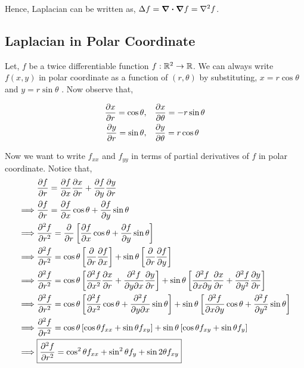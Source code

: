 \documentclass[../Analysis-3.tex]{subfiles}
\begin{document}
Hence, Laplacian can be written as, $\Delta f = \div\grad f = \laplacian f$.

\subsection*{Laplacian in Polar Coordinate}

Let, $f$ be a twice differentiable function $f: \mathbb{R}^2 \to \mathbb{R}$. We can always write $f(x,y)$ in polar coordinate as a function of $(r,\theta)$ by substituting, $x = r\cos{\theta}$ and $y= r\sin{\theta}$ . Now observe that,

\begin{align*}
    \pdv{x}{r} = \cos{\theta}, \quad & \pdv{x}{\theta} = -r\sin{\theta} \\
    \pdv{y}{r} = \sin{\theta}, \quad & \pdv{y}{\theta} = r\cos{\theta}
\end{align*}

Now we want to write $f_{xx}$ and $f_{yy}$ in terms of partial derivatives of $f$ in polar coordinate. Notice that,
\begin{align*}
             & \pdv{f}{r} = \pdv{f}{x} \pdv{x}{r} + \pdv{f}{y}\pdv{y}{r}                                                                                                                               \\
    \implies & \pdv{f}{r} = \pdv{f}{x} \cos{\theta} + \pdv{f}{y}\sin{\theta}                                                                                                                           \\
    \implies & \pdv[2]{f}{r} = \pdv{}{r} \left[\pdv{f}{x} \cos{\theta} + \pdv{f}{y} \sin{\theta} \right]                                                                                               \\
    \implies & \pdv[2]{f}{r} = \cos{\theta} \left[\pdv{}{r} \pdv{f}{x}\right] + \sin{\theta} \left[\pdv{}{r} \pdv{f}{y} \right]                                                                        \\
    \implies & \pdv[2]{f}{r} = \cos{\theta} \left[\pdv[2]{f}{x} \pdv{x}{r} + \pdv{f}{y}{x} \pdv{y}{r} \right] + \sin{\theta} \left[\pdv{f}{x}{y} \pdv{x}{r} + \pdv[2]{f}{y} \pdv{y}{r} \right]         \\
    \implies & \pdv[2]{f}{r} = \cos{\theta} \left[\pdv[2]{f}{x} \cos{\theta} + \pdv{f}{y}{x} \sin{\theta} \right] + \sin{\theta} \left[\pdv{f}{x}{y} \cos{\theta} + \pdv[2]{f}{y} \sin{\theta} \right] \\
    \implies & \pdv[2]{f}{r} = \cos{\theta} \left[\cos{\theta} f_{xx} + \sin{\theta} f_{xy} \right] + \sin{\theta} \left[\cos{\theta} f_{xy} + \sin{\theta} f_{y} \right]                              \\
    \implies & \boxed{\pdv[2]{f}{r} = \cos^2 \theta f_{xx} + \sin^2 \theta f_{y} + \sin 2 \theta f_{xy}}
\end{align*}
\end{document}
